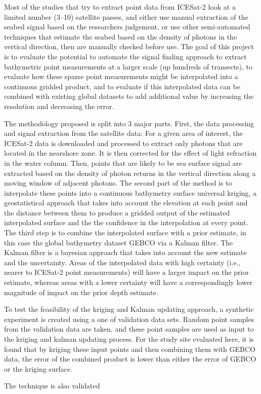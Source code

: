 Most of the studies that try to extract point data from ICESat-2 look at a limited number (3--10) satellite passes, and either use manual extraction of the seabed signal based on the researchers judgement, or use other semi-automated techniques that estimate the seabed based on the density of photons in the vertical direction, then are manually checked before use. The goal of this project is to evaluate the potential to automate the signal finding approach to extract bathymetric point measurements at a larger scale (up hundreds of transects), to evaluate how these sparse point measurements might be interpolated into a continuous gridded product, and to evaluate if this interpolated data can be combined with existing global datasets to add additional value by increasing the resolution and decreasing the error. 

The methodology proposed is split into 3 major parts. First, the data processing and signal extraction from the satellite data: For a given area of interest, the ICESat-2 data is downloaded and processed to extract only photons that are located in the nearshore zone. It is then corrected for the effect of light refraction in the water column. Then, points that are likely to be sea surface signal are extracted based on the density of photon returns in the vertical direction along a moving window of adjacent photons. The second part of the method is to interpolate these points into a continuous bathymetry surface universal kriging, a geostatistical approach that takes into account the elevation at each point and the distance between them to produce a gridded output of the estimated interpolated surface and the the confidence in the interpolation at every point. The third step is to combine the interpolated surface with a prior estimate, in this case the global bathymetry dataset GEBCO via a Kalman filter. The Kalman filter is a bayesian approach that takes into account the new estimate and the uncertainty. Areas of the interpolated data with high certainty (i.e., nearer to ICESat-2 point measurements) will have a larger impact on the prior estimate, whereas areas with a lower certainty will have a correspondingly lower magnitude of impact on the prior depth estimate.

To test the feasibility of the kriging and Kalman updating approach, a synthetic experiment is created using a one of validation data sets. Random point samples from the validation data are taken, and these point samples are used as input to the kriging and kalman updating process. For the study site evaluated here, it is found that by kriging these input points and then combining them with GEBCO data, the error of the combined product is lower than either the error of GEBCO or the kriging surface. 

The technique is also validated 